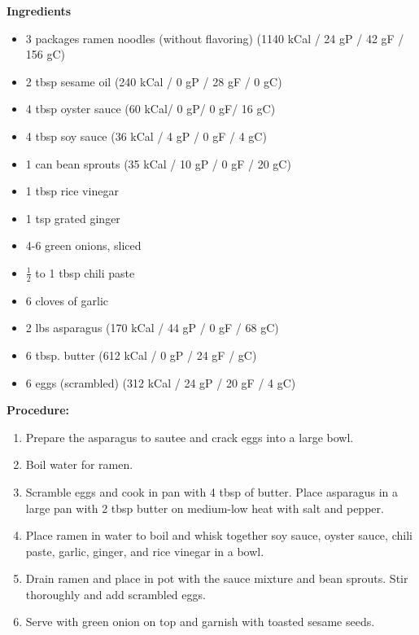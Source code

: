 \begin{multicols}{2}
\textbf{Ingredients}
\begin{itemize}
\item 3 packages ramen noodles (without flavoring) \newline (1140 kCal / 24 gP / 42 gF / 156 gC)
\item 2 tbsp sesame oil \quad (240 kCal / 0 gP / 28 gF / 0 gC)
\item 4 tbsp oyster sauce (60 kCal/ 0 gP/ 0 gF/ 16 gC)
\item 4 tbsp soy sauce \quad (36 kCal / 4 gP / 0 gF / 4 gC)
\item 1 can bean sprouts \quad (35 kCal / 10 gP / 0 gF / 20 gC)
\item 1 tbsp rice vinegar 
\item 1 tsp grated ginger
\item 4-6 green onions, sliced
\item $\frac{1}{2}$ to 1 tbsp chili paste 
\item 6 cloves of garlic
\item 2 lbs asparagus \quad (170 kCal / 44 gP / 0 gF / 68 gC)
\item 6 tbsp. butter  \quad (612 kCal / 0 gP / 24 gF /  gC)
\item 6 eggs (scrambled) \quad (312 kCal / 24 gP / 20 gF / 4 gC) 




\end{itemize}


\columnbreak
\textbf{Procedure:}
\medskip


\begin{enumerate}

\item Prepare the asparagus to sautee and crack eggs into a large bowl.
\item Boil water for ramen. 
\item Scramble eggs and cook in pan with 4 tbsp of butter. Place asparagus in a large pan with 2 tbsp butter on medium-low heat with salt and pepper. 
\item Place ramen in water to boil and whisk together soy sauce, oyster sauce, chili paste, garlic, ginger, and rice vinegar in a bowl. 
\item Drain ramen and place in pot with the sauce mixture and bean sprouts. Stir thoroughly and add scrambled eggs. 
\item Serve with green onion on top and garnish with toasted sesame seeds. 




\end{enumerate}
\end{multicols}

